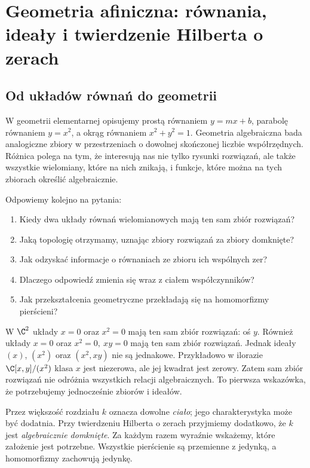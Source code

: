 \chapter{Geometria afiniczna: równania, ideały i twierdzenie Hilberta o zerach}
\label{ch:afiniczna}
\section{Od układów równań do geometrii}

W geometrii elementarnej opisujemy prostą równaniem $y=mx+b$, parabolę
równaniem $y=x^2$, a okrąg równaniem $x^2+y^2=1$. Geometria algebraiczna
bada analogiczne zbiory w przestrzeniach o dowolnej skończonej liczbie
współrzędnych. Różnica polega na tym, że interesują nas nie tylko
rysunki rozwiązań, ale także wszystkie wielomiany, które na nich znikają,
i funkcje, które można na tych zbiorach określić algebraicznie.

Odpowiemy kolejno na pytania:
\begin{enumerate}[label=\arabic*)]
\item Kiedy dwa układy równań wielomianowych mają ten sam zbiór rozwiązań?
\item Jaką topologię otrzymamy, uznając zbiory rozwiązań za zbiory domknięte?
\item Jak odzyskać informacje o równaniach ze zbioru ich wspólnych zer?
\item Dlaczego odpowiedź zmienia się wraz z ciałem współczynników?
\item Jak przekształcenia geometryczne przekładają się na homomorfizmy pierścieni?
\end{enumerate}

\begin{przyklad}
W $\C^2$ układy $x=0$ oraz $x^2=0$ mają ten sam zbiór
rozwiązań: oś $y$. Również układy $x=0$ oraz $x^2=0,\ xy=0$
mają ten sam zbiór rozwiązań. Jednak ideały $(x)$, $(x^2)$ oraz
$(x^2,xy)$ nie są jednakowe. Przykładowo w ilorazie
$\C[x,y]/(x^2)$ klasa $x$ jest niezerowa, ale jej kwadrat jest zerowy.
Zatem sam zbiór rozwiązań nie odróżnia wszystkich relacji algebraicznych.
To pierwsza wskazówka, że potrzebujemy jednocześnie zbiorów i ideałów.
\end{przyklad}

\begin{uwaga}
Przez większość rozdziału $k$ oznacza dowolne \emph{ciało}; jego
charakterystyka może być dodatnia. Przy twierdzeniu Hilberta o zerach
przyjmiemy dodatkowo, że $k$ jest \emph{algebraicznie domknięte}.
Za każdym razem wyraźnie wskażemy, które założenie jest potrzebne.
Wszystkie pierścienie są przemienne z jedynką, a homomorfizmy zachowują jedynkę.
\end{uwaga}

